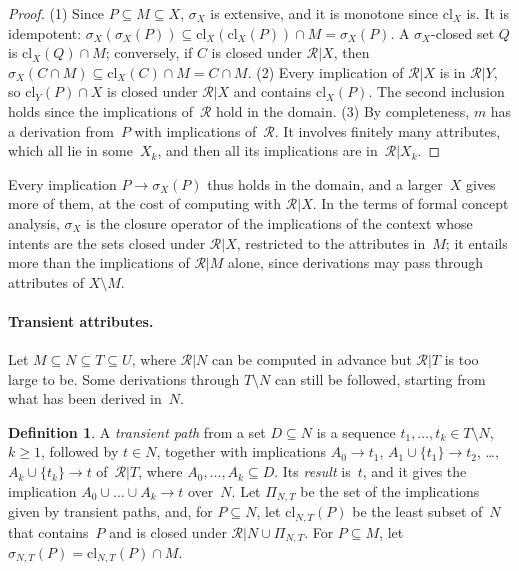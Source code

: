 \documentclass[11pt,a4paper]{article}
\theoremstyle{definition}
\newtheorem{definition}{Definition}
\theoremstyle{remark}
\begin{document}
\begin{proof}
(1) Since $P \subseteq M \subseteq X$, $\sigma_X$ is extensive, and it is monotone since $\mathrm{cl}_X$ is. It is idempotent: $\sigma_X(\sigma_X(P)) \subseteq \mathrm{cl}_X(\mathrm{cl}_X(P)) \cap M = \sigma_X(P)$. A $\sigma_X$-closed set $Q$ is $\mathrm{cl}_X(Q) \cap M$; conversely, if $C$ is closed under $\mathcal{R}|X$, then $\sigma_X(C \cap M) \subseteq \mathrm{cl}_X(C) \cap M = C \cap M$.
(2) Every implication of $\mathcal{R}|X$ is in $\mathcal{R}|Y$, so $\mathrm{cl}_Y(P) \cap X$ is closed under $\mathcal{R}|X$ and contains $\mathrm{cl}_X(P)$. The second inclusion holds since the implications of~$\mathcal{R}$ hold in the domain.
(3) By completeness, $m$ has a derivation from~$P$ with implications of~$\mathcal{R}$. It involves finitely many attributes, which all lie in some~$X_k$, and then all its implications are in~$\mathcal{R}|X_k$.
\end{proof}

Every implication $P \to \sigma_X(P)$ thus holds in the domain, and a larger~$X$ gives more of them, at the cost of computing with $\mathcal{R}|X$. In the terms of formal concept analysis, $\sigma_X$ is the closure operator of the implications of the context whose intents are the sets closed under $\mathcal{R}|X$, restricted to the attributes in~$M$; it entails more than the implications of $\mathcal{R}|M$ alone, since derivations may pass through attributes of $X \setminus M$.

\paragraph{Transient attributes.}
Let $M \subseteq N \subseteq T \subseteq U$, where $\mathcal{R}|N$ can be computed in advance but $\mathcal{R}|T$ is too large to be. Some derivations through $T \setminus N$ can still be followed, starting from what has been derived in~$N$.

\begin{definition}
A \emph{transient path} from a set $D \subseteq N$ is a sequence $t_1, \dots, t_k \in T \setminus N$, $k \ge 1$, followed by $t \in N$, together with implications $A_0 \to t_1$, $A_1 \cup \{t_1\} \to t_2$, \dots, $A_k \cup \{t_k\} \to t$ of~$\mathcal{R}|T$, where $A_0, \dots, A_k \subseteq D$. Its \emph{result} is~$t$, and it gives the implication $A_0 \cup \dots \cup A_k \to t$ over~$N$. Let $\Pi_{N,T}$ be the set of the implications given by transient paths, and, for $P \subseteq N$, let $\mathrm{cl}_{N,T}(P)$ be the least subset of~$N$ that contains~$P$ and is closed under $\mathcal{R}|N \cup \Pi_{N,T}$. For $P \subseteq M$, let $\sigma_{N,T}(P) = \mathrm{cl}_{N,T}(P) \cap M$.
\end{definition}
\end{document}
